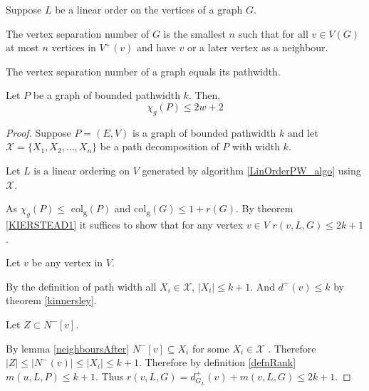 \begin{definition}
    Suppose $L$ be a linear order on the vertices of a graph $G$. 
    
    The vertex separation number of $G$ is the smallest $n$ such that for all $v\in V(G)$ at most $n$ vertices in $V^+(v)$ and have $v$ or a later vertex as a neighbour.
\end{definition}

\begin{theorem}\label{kinnersley}
    The vertex separation number of a graph equals its pathwidth.
\end{theorem}

\begin{theorem}
    Let $P$ be a graph of bounded pathwidth $k$. Then, 
    \[\chi_g(P) \leq 2w + 2\]
    
\end{theorem}

\begin{proof}
    Suppose $P=(E,V)$ is a graph of bounded pathwidth $k$ and let $\mathcal{X} = \{X_1,X_2,\dots,X_n\}$ be a path decomposition of $P$ with width $k$.
    
    Let $L$ is a linear ordering on $V$ generated by algorithm \ref*{LinOrderPW_algo} using $\mathcal{X}$. 
    
    As $\chi_g(P) \leq$ col\textsubscript{g}$(P)$ and col\textsubscript{g}$(G)\leq 1+r(G)$. By theorem \ref{KIERSTEAD1} it suffices to show that for any vertex $v \in V$ $r(v,L,G) \leq 2k + 1$.        
    
    Let $v$ be any vertex in $V$. 
    
    By the definition of path width  all $X_i \in \mathcal{X}$, $ \left| X_i \right| \leq k + 1 $. And $d^+(v) \leq k$ by theorem \ref{kinnersley}.

    Let $Z\subset N^-[v]$.
    
    By lemma \ref{neighboursAfter} $N^-[v] \subseteq X_i$ for some $X_i \in \mathcal{X}$ . Therefore $\left| Z\right| \leq \left| N^-(v)\right| \leq |X_i| \leq k+1$. Therefore by definition \ref{defnRank} $m(u,L,P) \leq k+1$. Thus $r(v,L,G) = d^+_{G_L}(v) + m(v,L,G) \leq 2k +1$.
    
    
\end{proof}

